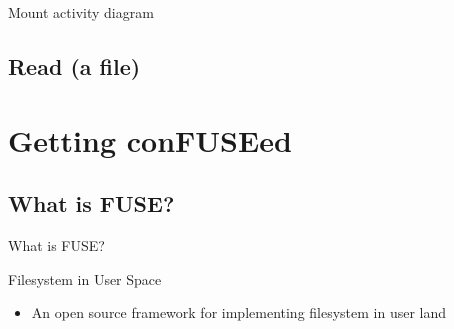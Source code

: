 \documentclass{beamer}
\begin{document}
\begin{frame}{Mount activity diagram}
	
	
\end{frame}

\subsection{Read (a file)}


\section{Getting conFUSEed}

\subsection{What is FUSE?}

\begin{frame}{What is FUSE?}

	\begin{block}{Filesystem in User Space}

		\begin{itemize}[<+->]

			\item{An open source framework for implementing filesystem in user land}\footnotemark[1]
	
		\end{itemize}

	\end{block}


\end{frame}
\end{document}
